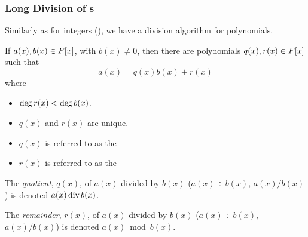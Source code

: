 \subsubsection{Long Division of s}\label{subsubsec:Polynomial_Long_Division}
Similarly as for integers (), we have a division algorithm for polynomials.
\begin{definition}\label{def:Polynomial_Long_Division}
  If $a(x), b(x) \in F[x]$, with $b(x) \neq 0$, then there are polynomials $q(x), r(x) \in F[x]$ such that
  \begin{equation}\label{eq:Polynomials_Long_Division}
    a(x) = q(x) b(x) + r(x)
  \end{equation}
  where
  \begin{itemize}[noitemsep]
  \item $\operatorname{\operatorname{deg}} r(x) < \operatorname{\operatorname{deg}} b(x)$.
  \item $q(x)$ and $r(x)$ are unique.
  \item $q(x)$ is referred to as the 
  \item $r(x)$ is referred to as the 
  \end{itemize}
\end{definition}

\begin{definition}\label{def:Polynomial_Quotient}
  The \emph{ quotient}, $q(x)$, of $a(x)$ divided by $b(x)$ ($a(x) \div b(x)$, $a(x) / b(x)$) is denoted $a(x) \operatorname{\operatorname{div}} b(x)$.
\end{definition}

\begin{definition}\label{def:Polynomial_Remainder}
  The \emph{ remainder}, $r(x)$, of $a(x)$ divided by $b(x)$ ($a(x) \div b(x)$, $a(x) / b(x)$) is denoted $a(x) \bmod b(x)$.
\end{definition}

